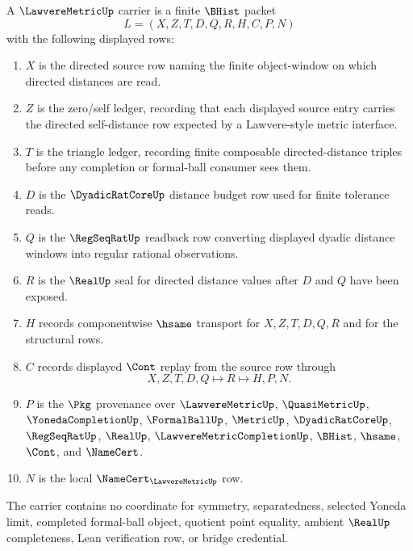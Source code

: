 \begin{definition}
\label{def:lawvere-metric-carrier}
A $\LawvereMetricUp$ carrier is a finite $\BHist$ packet
$$
L=(X,Z,T,D,Q,R,H,C,P,N)
$$
with the following displayed rows:
\begin{enumerate}
\item $X$ is the directed source row naming the finite object-window on which directed distances are read.
\item $Z$ is the zero/self ledger, recording that each displayed source entry carries the directed self-distance row expected by a Lawvere-style metric interface.
\item $T$ is the triangle ledger, recording finite composable directed-distance triples before any completion or formal-ball consumer sees them.
\item $D$ is the $\DyadicRatCoreUp$ distance budget row used for finite tolerance reads.
\item $Q$ is the $\RegSeqRatUp$ readback row converting displayed dyadic distance windows into regular rational observations.
\item $R$ is the $\RealUp$ seal for directed distance values after $D$ and $Q$ have been exposed.
\item $H$ records componentwise $\hsame$ transport for $X,Z,T,D,Q,R$ and for the structural rows.
\item $C$ records displayed $\Cont$ replay from the source row through
$$
X,Z,T,D,Q \longmapsto R \longmapsto H,P,N .
$$
\item $P$ is the $\Pkg$ provenance over $\LawvereMetricUp$, $\QuasiMetricUp$, $\YonedaCompletionUp$, $\FormalBallUp$, $\MetricUp$, $\DyadicRatCoreUp$, $\RegSeqRatUp$, $\RealUp$, $\LawvereMetricCompletionUp$, $\BHist$, $\hsame$, $\Cont$, and $\NameCert$.
\item $N$ is the local $\NameCert_{\LawvereMetricUp}$ row.
\end{enumerate}
The carrier contains no coordinate for symmetry, separatedness, selected Yoneda limit, completed formal-ball object, quotient point equality, ambient $\RealUp$ completeness, Lean verification row, or bridge credential.
\end{definition}

